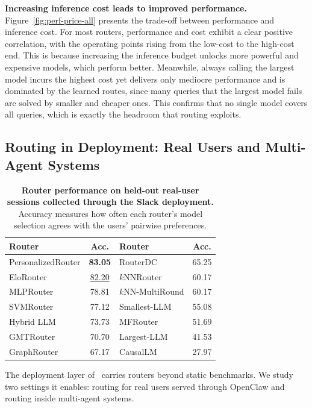\noindent\textbf{Increasing inference cost leads to improved performance.} Figure~\ref{fig:perf-price-all} presents the trade-off between performance and inference cost. For most routers, performance and cost exhibit a clear positive correlation, with the operating points rising from the low-cost to the high-cost end. This is because increasing the inference budget unlocks more powerful and expensive models, which perform better. Meanwhile, always calling the largest model incurs the highest cost yet delivers only mediocre performance and is dominated by the learned routes, since many queries that the largest model fails are solved by smaller and cheaper ones. This confirms that no single model covers all queries, which is exactly the headroom that routing exploits.


\subsection{Routing in Deployment: Real Users and Multi-Agent Systems}
\label{sec:extension-study}
\begin{table}
\vspace{-20pt}
\centering
\caption{\textbf{Router performance on held-out real-user sessions collected through the Slack deployment.} Accuracy measures how often each router's model selection agrees with the users' pairwise preferences.}
\label{tab:personalized_human}
\small
\setlength{\tabcolsep}{4pt}
\begin{tabular}{lc|lc}
\toprule
\textbf{Router} & \textbf{Acc.} & \textbf{Router} & \textbf{Acc.} \\
\midrule
PersonalizedRouter & \textbf{83.05} & RouterDC & 65.25 \\
EloRouter & \underline{82.20} & $k$NNRouter & 60.17 \\
MLPRouter & 78.81 & $k$NN-MultiRound & 60.17 \\
SVMRouter & 77.12 & Smallest-LLM & 55.08 \\
Hybrid LLM & 73.73 & MFRouter & 51.69 \\
GMTRouter & 70.70 & Largest-LLM & 41.53 \\
GraphRouter & 67.17 & CausalLM & 27.97 \\
\bottomrule
\end{tabular}
\vspace{-20pt}
\end{table}

The deployment layer of \method\ carries routers beyond static benchmarks. We study two settings it enables: routing for real users served through OpenClaw and routing inside multi-agent systems.

